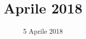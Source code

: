 


\title{ Aprile 2018}
\author{\GroupName}

\date{5 Aprile 2018}



\frenchspacing

\makeFrontPage




